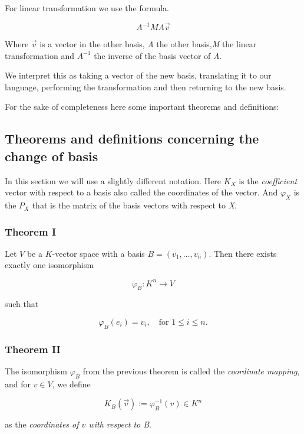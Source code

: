 For linear transformation we use the formula.

\[
    A^{-1} M A \vec{v}
\]

Where \(\vec{v}\) is a vector in the other basis, \emph{A} the
other basis,\emph{M} the linear transformation and \(A^{-1}\) the inverse of
the basis vector of \emph{A}.
\vspace{\baselineskip}

We interpret this as taking a vector of the new basis, translating it to our language,
performing the transformation and then returning to the new basis.
\vspace{\baselineskip}

For the sake of completeness here some important theorems and definitions:

\subsection{Theorems and definitions concerning the change of basis}

In this section we will use a slightly different notation. Here \(K_X\) is 
the \emph{coefficient} vector with respect to a basis also called the coordinates
of the vector. And \(\varphi_X\) is the \(P_X\) that is the matrix of the basis vectors with
respect to \emph{X}.

\subsubsection{Theorem I} 

Let \( V \) be a \( K \)-vector space with a basis \( B = (v_1, \ldots, v_n) \).  
Then there exists exactly one isomorphism 

\[
    \varphi_B : K^n \to V
\]

such that

\[
    \varphi_B(e_i) = v_i, \quad \text{for } 1 \leq i \leq n.
\]

\subsubsection{Theorem II} 

The isomorphism \( \varphi_B \) from the previous theorem is called the \emph{coordinate mapping},  
and for \( v \in V \), we define

\[
    K_B (\vec{v}) := \varphi_B^{-1} (v) \in K^n
\]

as the \emph{coordinates of \( v \) with respect to \emph{B}}.

